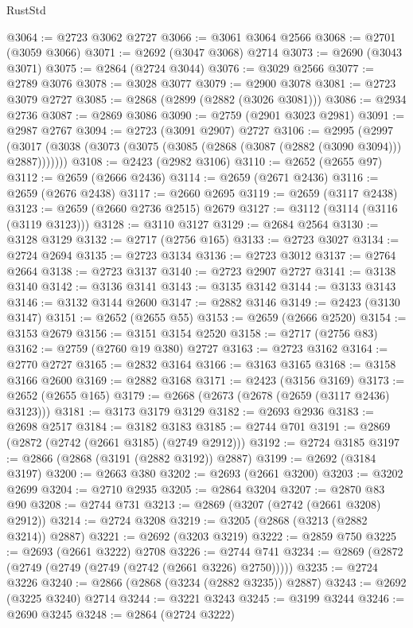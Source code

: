 \begin{lexlean}{RustStd}
\begin{coremodule}
@3064 := @2723 @3062 @2727
@3066 := @3061 @3064 @2566
@3068 := @2701 (@3059 @3066)
@3071 := @2692 (@3047 @3068) @2714
@3073 := @2690 (@3043 @3071)
@3075 := @2864 (@2724 @3044)
@3076 := @3029 @2566
@3077 := @2789 @3076
@3078 := @3028 @3077
@3079 := @2900 @3078
@3081 := @2723 @3079 @2727
@3085 := @2868 (@2899 (@2882 (@3026 @3081)))
@3086 := @2934 @2736
@3087 := @2869 @3086
@3090 := @2759 (@2901 @3023 @2981)
@3091 := @2987 @2767
@3094 := @2723 (@3091 @2907) @2727
@3106 := @2995
    (@2997 (@3017 (@3038 (@3073 (@3075 (@3085 (@2868 (@3087 (@2882 (@3090 @3094))) @2887)))))))
@3108 := @2423 (@2982 @3106)
@3110 := @2652 (@2655 @97)
@3112 := @2659 (@2666 @2436)
@3114 := @2659 (@2671 @2436)
@3116 := @2659 (@2676 @2438)
@3117 := @2660 @2695
@3119 := @2659 (@3117 @2438)
@3123 := @2659 (@2660 @2736 @2515) @2679
@3127 := @3112 (@3114 (@3116 (@3119 @3123)))
@3128 := @3110 @3127
@3129 := @2684 @2564
@3130 := @3128 @3129
@3132 := @2717 (@2756 @165)
@3133 := @2723 @3027
@3134 := @2724 @2694
@3135 := @2723 @3134
@3136 := @2723 @3012
@3137 := @2764 @2664
@3138 := @2723 @3137
@3140 := @2723 @2907 @2727
@3141 := @3138 @3140
@3142 := @3136 @3141
@3143 := @3135 @3142
@3144 := @3133 @3143
@3146 := @3132 @3144 @2600
@3147 := @2882 @3146
@3149 := @2423 (@3130 @3147)
@3151 := @2652 (@2655 @55)
@3153 := @2659 (@2666 @2520)
@3154 := @3153 @2679
@3156 := @3151 @3154 @2520
@3158 := @2717 (@2756 @83)
@3162 := @2759 (@2760 @19 @380) @2727
@3163 := @2723 @3162
@3164 := @2770 @2727
@3165 := @2832 @3164
@3166 := @3163 @3165
@3168 := @3158 @3166 @2600
@3169 := @2882 @3168
@3171 := @2423 (@3156 @3169)
@3173 := @2652 (@2655 @165)
@3179 := @2668 (@2673 (@2678 (@2659 (@3117 @2436) @3123)))
@3181 := @3173 @3179 @3129
@3182 := @2693 @2936
@3183 := @2698 @2517
@3184 := @3182 @3183
@3185 := @2744 @701
@3191 := @2869 (@2872 (@2742 (@2661 @3185) (@2749 @2912)))
@3192 := @2724 @3185
@3197 := @2866 (@2868 (@3191 (@2882 @3192)) @2887)
@3199 := @2692 (@3184 @3197)
@3200 := @2663 @380
@3202 := @2693 (@2661 @3200)
@3203 := @3202 @2699
@3204 := @2710 @2935
@3205 := @2864 @3204
@3207 := @2870 @83 @90
@3208 := @2744 @731
@3213 := @2869 (@3207 (@2742 (@2661 @3208) @2912))
@3214 := @2724 @3208
@3219 := @3205 (@2868 (@3213 (@2882 @3214)) @2887)
@3221 := @2692 (@3203 @3219)
@3222 := @2859 @750
@3225 := @2693 (@2661 @3222) @2708
@3226 := @2744 @741
@3234 := @2869 (@2872 (@2749 (@2749 (@2749 (@2742 (@2661 @3226) @2750)))))
@3235 := @2724 @3226
@3240 := @2866 (@2868 (@3234 (@2882 @3235)) @2887)
@3243 := @2692 (@3225 @3240) @2714
@3244 := @3221 @3243
@3245 := @3199 @3244
@3246 := @2690 @3245
@3248 := @2864 (@2724 @3222)

\end{coremodule}
\end{lexlean}
